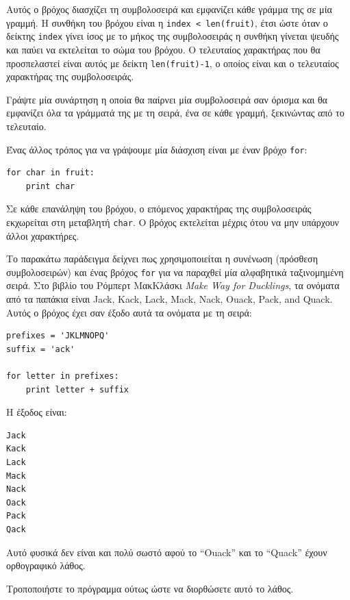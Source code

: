 \documentclass[10pt]{book}
\begin{document}
Αυτός ο βρόχος διασχίζει τη συμβολοσειρά και εμφανίζει κάθε γράμμα της σε μία γραμμή. Η συνθήκη του βρόχου είναι η {\tt index < len(fruit)}, έτσι ώστε όταν ο δείκτης {\tt index} γίνει ίσος με το μήκος της συμβολοσειράς η συνθήκη γίνεται ψευδής και παύει να εκτελείται το σώμα του βρόχου. Ο τελευταίος χαρακτήρας που θα προσπελαστεί είναι αυτός με δείκτη {\tt len(fruit)-1}, ο οποίος είναι και ο τελευταίος χαρακτήρας της συμβολοσειράς.
\\
\begin{exercise}

Γράψτε μία συνάρτηση η οποία θα παίρνει μία συμβολοσειρά σαν όρισμα
και θα εμφανίζει όλα τα γράμματά της με τη σειρά, ένα σε κάθε γραμμή,
ξεκινώντας από το τελευταίο.
\end{exercise}

Ένας άλλος τρόπος για να γράψουμε μία διάσχιση είναι με έναν βρόχο {\tt for}:

\begin{verbatim}
for char in fruit:
    print char
\end{verbatim}
%

Σε κάθε επανάληψη του βρόχου, ο επόμενος χαρακτήρας της συμβολοσειράς εκχωρείται στη μεταβλητή {\tt char}. Ο βρόχος εκτελείται μέχρις ότου να μην υπάρχουν άλλοι χαρακτήρες.

Το παρακάτω παράδειγμα δείχνει πως χρησιμοποιείται η συνένωση (πρόσθεση συμβολοσειρών) και ένας βρόχος {\tt for} για να παραχθεί μία αλφαβητικά ταξινομημένη σειρά. Στο βιβλίο του Ρόμπερτ ΜακΚλάσκι {\em Make Way for Ducklings}, τα ονόματα από τα παπάκια είναι Jack, Kack, Lack, Mack, Nack, Ouack, Pack, and Quack. Αυτός ο βρόχος έχει σαν έξοδο αυτά τα ονόματα με τη σειρά:

\begin{verbatim}
prefixes = 'JKLMNOPQ'
suffix = 'ack'

for letter in prefixes:
    print letter + suffix
\end{verbatim}
%

Η έξοδος είναι:

\begin{verbatim}
Jack
Kack
Lack
Mack
Nack
Oack
Pack
Qack
\end{verbatim}
%

Αυτό φυσικά δεν είναι και πολύ σωστό αφού το ``Ouack'' και το ``Quack'' 
έχουν ορθογραφικό λάθος.
\\
\begin{exercise}

Τροποποιήστε το πρόγραμμα ούτως ώστε να διορθώσετε αυτό το λάθος.
\end{exercise}
\end{document}
